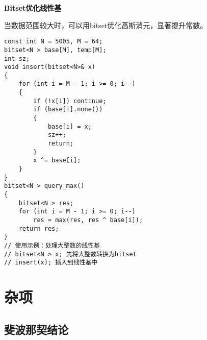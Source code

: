 \documentclass[a4paper, fontset=none]{ctexart}
\begin{document}
\textbf{Bitset优化线性基}

当数据范围较大时，可以用bitset优化高斯消元，显著提升常数。

\begin{verbatim}
const int N = 5005, M = 64;
bitset<N > base[M], temp[M];
int sz;
void insert(bitset<N>& x)
{
    for (int i = M - 1; i >= 0; i--)
    {
        if (!x[i]) continue;
        if (base[i].none())
        {
            base[i] = x;
            sz++;
            return;
        }
        x ^= base[i];
    }
}
bitset<N > query_max()
{
    bitset<N > res;
    for (int i = M - 1; i >= 0; i--)
        res = max(res, res ^ base[i]);
    return res;
}
// 使用示例：处理大整数的线性基
// bitset<N > x; 先将大整数转换为bitset
// insert(x); 插入到线性基中
\end{verbatim}

\section{杂项}
\subsection{斐波那契结论}
\end{document}
